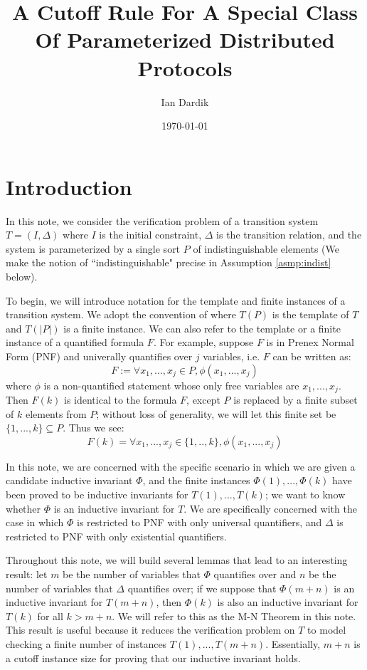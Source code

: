 \documentclass[12pt]{article}
\title{A Cutoff Rule For A Special Class Of Parameterized Distributed Protocols}
\author{Ian Dardik}
\date{\today}
\theoremstyle{definition}
\theoremstyle{remark}
\begin{document}
\maketitle

\section{Introduction}
In this note, we consider the verification problem of a transition system $T=(I,\Delta)$ where $I$ is the initial constraint, $\Delta$ is the transition relation, and the system is parameterized by a single sort $P$ of indistinguishable elements (We make the notion of ``indistinguishable" precise in Assumption \ref{asmp:indist} below).  

To begin, we will introduce notation for the template and finite instances of a transition system.  We adopt the convention of \cite{goel2021symmetry} where $T(P)$ is the template of $T$ and $T(|P|)$ is a finite instance.  We can also refer to the template or a finite instance of a quantified formula $F$.  For example, suppose $F$ is in Prenex Normal Form (PNF) and univerally quantifies over $j$ variables, i.e. $F$ can be written as:
$$F := \forall x_1,...,x_j \in P, \phi(x_1,...,x_j)$$
where $\phi$ is a non-quantified statement whose only free variables are $x_1,...,x_j$.  Then $F(k)$ is identical to the formula $F$, except $P$ is replaced by a finite subset of $k$ elements from $P$; without loss of generality, we will let this finite set be $\{1,...,k\} \subseteq P$.  Thus we see:
$$F(k) = \forall x_1,...,x_j \in \{1,..,k\}, \phi(x_1,...,x_j)$$

In this note, we are concerned with the specific scenario in which we are given a candidate inductive invariant $\Phi$, and the finite instances $\Phi(1),...,\Phi(k)$ have been proved to be inductive invariants for $T(1),...,T(k)$; we want to know whether $\Phi$ is an inductive invariant for $T$.  We are specifically concerned with the case in which $\Phi$ is restricted to PNF with only universal quantifiers, and $\Delta$ is restricted to PNF with only existential quantifiers.

Throughout this note, we will build several lemmas that lead to an interesting result: let $m$ be the number of variables that $\Phi$ quantifies over and $n$ be the number of variables that $\Delta$ quantifies over; if we suppose that $\Phi(m+n)$ is an inductive invariant for $T(m+n)$, then $\Phi(k)$ is also an inductive invariant for $T(k)$ for all $k>m+n$.  We will refer to this as the M-N Theorem in this note.  This result is useful because it reduces the verification problem on $T$ to model checking a finite number of instances $T(1),...,T(m+n)$.  Essentially, $m+n$ is a cutoff instance size for proving that our inductive invariant holds.
\end{document}
